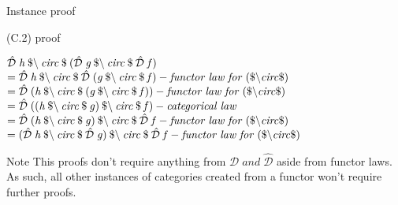 \documentclass{beamer}
\newcommand{\Varid}[1]{\mathit{#1}}
\begin{document}
\begin{frame}{Instance proof}

\begin{block}{(C.2) proof}

\ensuremath{\mathcal{\hat{D}}\;\Varid{h}\mathbin{\$\char92 }\Varid{circ}\mathbin{\$}(\mathcal{\hat{D}}\;\Varid{g}\mathbin{\$\char92 }\Varid{circ}\mathbin{\$}\mathcal{\hat{D}}\;\Varid{f})}
\ensuremath{\mathrel{=}\mathcal{\hat{D}}\;\Varid{h}\mathbin{\$\char92 }\Varid{circ}\mathbin{\$}\mathcal{\hat{D}}\;(\Varid{g}\mathbin{\$\char92 }\Varid{circ}\mathbin{\$}\Varid{f})\mathbin{-}\Varid{functor}\;\Varid{law}\;\Varid{for}\;(\mathbin{\$\char92 }\Varid{circ}\mathbin{\$})}
\ensuremath{\mathrel{=}\mathcal{\hat{D}}\;(\Varid{h}\mathbin{\$\char92 }\Varid{circ}\mathbin{\$}(\Varid{g}\mathbin{\$\char92 }\Varid{circ}\mathbin{\$}\Varid{f}))\mathbin{-}\Varid{functor}\;\Varid{law}\;\Varid{for}\;(\mathbin{\$\char92 }\Varid{circ}\mathbin{\$})}
\ensuremath{\mathrel{=}\mathcal{\hat{D}}\;((\Varid{h}\mathbin{\$\char92 }\Varid{circ}\mathbin{\$}\Varid{g})\mathbin{\$\char92 }\Varid{circ}\mathbin{\$}\Varid{f})\mathbin{-}\Varid{categorical}\;\Varid{law}}
\ensuremath{\mathrel{=}\mathcal{\hat{D}}\;(\Varid{h}\mathbin{\$\char92 }\Varid{circ}\mathbin{\$}\Varid{g})\mathbin{\$\char92 }\Varid{circ}\mathbin{\$}\mathcal{\hat{D}}\;\Varid{f}\mathbin{-}\Varid{functor}\;\Varid{law}\;\Varid{for}\;(\mathbin{\$\char92 }\Varid{circ}\mathbin{\$})}
\ensuremath{\mathrel{=}(\mathcal{\hat{D}}\;\Varid{h}\mathbin{\$\char92 }\Varid{circ}\mathbin{\$}\mathcal{\hat{D}}\;\Varid{g})\mathbin{\$\char92 }\Varid{circ}\mathbin{\$}\mathcal{\hat{D}}\;\Varid{f}\mathbin{-}\Varid{functor}\;\Varid{law}\;\Varid{for}\;(\mathbin{\$\char92 }\Varid{circ}\mathbin{\$})}

\end{block}

\begin{alertblock}{Note}
This proofs don't require anything from \ensuremath{\mathcal{D}\;\Varid{and}\;\mathcal{\hat{D}}} aside from functor laws.
As such, all other instances of categories created from a functor won't require further proofs.

\end{alertblock}
\end{frame}
\end{document}
